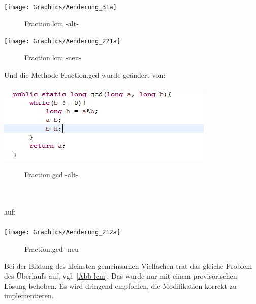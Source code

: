\documentclass[a4paper, 11pt]{book}
\begin{document}
{%

\texttt{[image: Graphics/Aenderung\_31a]}\label{Abb lcm}
\begin{figure}[h]
	\caption{Fraction.lcm -alt-}
\end{figure}


\texttt{[image: Graphics/Aenderung\_221a]}
\begin{figure}[h]
	\caption{Fraction.lcm -neu-}
\end{figure}


Und die Methode Fraction.gcd wurde geändert von:\\
\\
\includegraphics[scale = 0.95]{Graphics/Aenderung_211}
\begin{figure}[h]
	\caption{Fraction.gcd -alt-}
\end{figure}
\\
\\

auf:\\
\\
\texttt{[image: Graphics/Aenderung\_212a]}
\begin{figure}[h]
	\caption{Fraction.gcd -neu-}
\end{figure}

Bei der Bildung des kleinsten gemeinsamen Vielfachen trat das gleiche Problem des Überlaufs auf, vgl. \ref{Abb lcm}. Das wurde nur mit einem provisorischen Lösung behoben. Es wird dringend empfohlen, die Modifikation korrekt zu implementieren.


}
\end{document}
